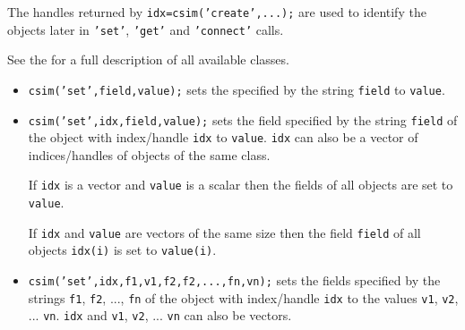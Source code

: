 The handles returned by \texttt{idx=csim('create',...);} are used to
identify the objects later in \texttt{'set'}, \texttt{'get'} and
\texttt{'connect'} calls.

See the  for a full description of
all available classes.


\begin{itemize}
  
\item \texttt{csim('set',field,value);} sets the
   specified by the string
  \texttt{field} to \texttt{value}.
  
\item \texttt{csim('set',idx,field,value);} sets the field specified
  by the string \texttt{field} of the object with index/handle
  \texttt{idx} to \texttt{value}. \texttt{idx} can also be a vector
  of indices/handles of objects of the same class.
  
If \texttt{idx} is a vector and \texttt{value} is a scalar then the
fields of all objects are set to \texttt{value}.

If \texttt{idx} and \texttt{value} are vectors of the same size then
the field \texttt{field} of all objects \texttt{idx(i)} is set to
\texttt{value(i)}.

\item \texttt{csim('set',idx,f1,v1,f2,f2,...,fn,vn);} sets the fields
  specified by the strings \texttt{f1}, \texttt{f2}, ..., \texttt{fn}
  of the object with index/handle \texttt{idx} to the values
  \texttt{v1}, \texttt{v2}, ... \texttt{vn}. \texttt{idx} and
  \texttt{v1}, \texttt{v2}, ... \texttt{vn} can also be vectors.

\end{itemize}



